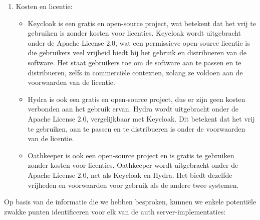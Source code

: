 \begin{enumerate}
  \item Kosten en licentie:
  \begin{itemize}
    \item Keycloak is een gratis en open-source project, wat betekent dat het vrij te gebruiken is zonder kosten voor licenties. Keycloak wordt uitgebracht onder de Apache License 2.0, wat een permissieve open-source licentie is die gebruikers veel vrijheid biedt bij het gebruik en distribueren van de software. Het staat gebruikers toe om de software aan te passen en te distribueren, zelfs in commerciële contexten, zolang ze voldoen aan de voorwaarden van de licentie.
    \item Hydra is ook een gratis en open-source project, dus er zijn geen kosten verbonden aan het gebruik ervan. Hydra wordt uitgebracht onder de Apache License 2.0, vergelijkbaar met Keycloak. Dit betekent dat het vrij te gebruiken, aan te passen en te distribueren is onder de voorwaarden van de licentie.
    \item Oathkeeper is ook een open-source project en is gratis te gebruiken zonder kosten voor licenties. Oathkeeper wordt uitgebracht onder de Apache License 2.0, net als Keycloak en Hydra. Het biedt dezelfde vrijheden en voorwaarden voor gebruik als de andere twee systemen.
  \end{itemize}
\end{enumerate}

Op basis van de informatie die we hebben besproken, kunnen we enkele potentiële zwakke punten identificeren voor elk van de auth server-implementaties:

